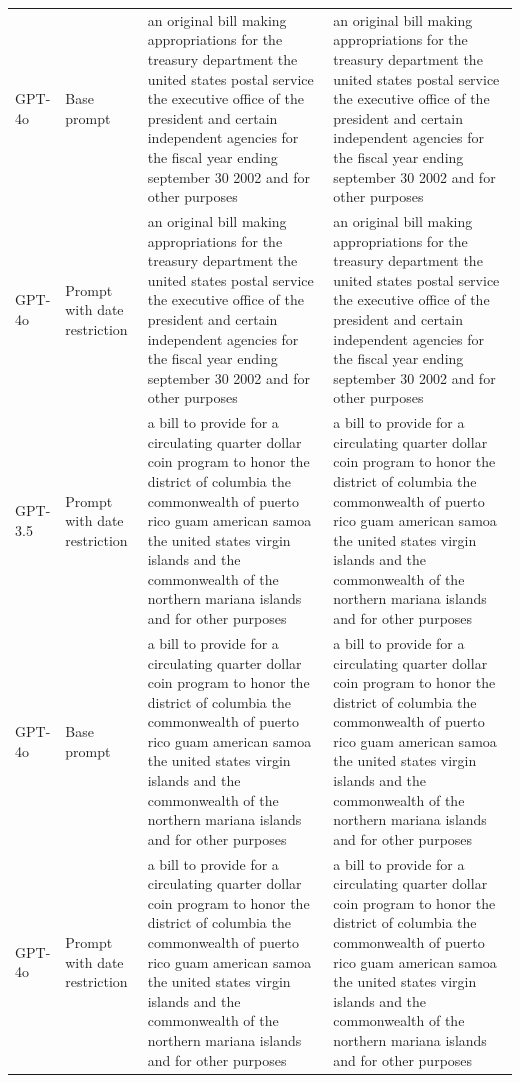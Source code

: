 \begin{longtable}{>{\raggedright\arraybackslash}p{1.4cm}>{\raggedright\arraybackslash}p{1.4cm}>{\raggedright\arraybackslash}p{5.5cm}>{\raggedright\arraybackslash}p{5.5cm}}
GPT-4o & Base prompt & an original bill making appropriations for the treasury department the united states postal service the executive office of the president and certain independent agencies for the fiscal year ending september 30 2002 and for other purposes & an original bill making appropriations for the treasury department the united states postal service the executive office of the president and certain independent agencies for the fiscal year ending september 30 2002 and for other purposes\\
GPT-4o & Prompt with date restriction & an original bill making appropriations for the treasury department the united states postal service the executive office of the president and certain independent agencies for the fiscal year ending september 30 2002 and for other purposes & an original bill making appropriations for the treasury department the united states postal service the executive office of the president and certain independent agencies for the fiscal year ending september 30 2002 and for other purposes\\
GPT-3.5 & Prompt with date restriction & a bill to provide for a circulating quarter dollar coin program to honor the district of columbia the commonwealth of puerto rico guam american samoa the united states virgin islands and the commonwealth of the northern mariana islands and for other purposes & a bill to provide for a circulating quarter dollar coin program to honor the district of columbia the commonwealth of puerto rico guam american samoa the united states virgin islands and the commonwealth of the northern mariana islands and for other purposes\\
GPT-4o & Base prompt & a bill to provide for a circulating quarter dollar coin program to honor the district of columbia the commonwealth of puerto rico guam american samoa the united states virgin islands and the commonwealth of the northern mariana islands and for other purposes & a bill to provide for a circulating quarter dollar coin program to honor the district of columbia the commonwealth of puerto rico guam american samoa the united states virgin islands and the commonwealth of the northern mariana islands and for other purposes\\
GPT-4o & Prompt with date restriction & a bill to provide for a circulating quarter dollar coin program to honor the district of columbia the commonwealth of puerto rico guam american samoa the united states virgin islands and the commonwealth of the northern mariana islands and for other purposes & a bill to provide for a circulating quarter dollar coin program to honor the district of columbia the commonwealth of puerto rico guam american samoa the united states virgin islands and the commonwealth of the northern mariana islands and for other purposes\\

\end{longtable}
